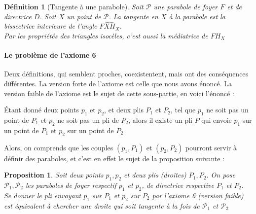 \documentclass[a4paper,12pt,french]{report}
\newtheorem{proposition}{Proposition}[section]
\newtheorem{definition}{Définition}[section]
\begin{document}
			\begin{definition}[Tangente à une parabole]
				Soit $\mathcal{P}$ une parabole de foyer $F$ et de directrice $D$. Soit $X$ un point de $\mathcal{P}$. La tangente en $X$ à la parabole est la bissectrice interieure de l'angle $\widehat{FXH_{X}}$.\\
				Par les propriétés des triangles isocèles, c'est aussi la médiatrice de $FH_{X}$
			\end{definition}
			
			\paragraph{Le problème de l'axiome 6}
			Deux définitions, qui semblent proches, coexistentent, mais ont des conséquences différentes. La version forte de l'axiome est celle que nous avons énoncé. La version faible de l'axiome est le sujet de cette sous-partie, en voici l'énoncé :
			
			\begin{axiome}
			Étant donné deux points $p_{1}$ et $p_{2}$, et deux plis $P_{1}$ et $P_{2}$, tel que $p_{1}$ ne soit pas un point de $P_{1}$ et $p_{2}$ ne soit pas un pli de $P_{2}$, alors il existe un pli $P$ qui envoie $p_{1}$ sur un point de $P_{1}$ et $p_{2}$ sur un point de $P_{2}$
			\end{axiome}
			
			Alors, on comprends que les couples $(p_{1},P_{1})$ et $(p_{2},P_{2})$ pourront servir à définir des paraboles, et c'est en effet le sujet de la proposition suivante : 
			
			\begin{proposition}
				Soit deux points $p_{1},p_{2}$ et deux plis (droites) $P_{1},P_{2}$. On pose $\mathcal{P}_{1},\mathcal{P}_{2}$ les paraboles de foyer respectif $p_{1}$ et $p_{2}$, de directrice respective $P_{1}$ et $P_{2}$. Se donner le pli envoyant $p_{1}$ sur $P_{1}$ et $p_{2}$ sur $P_{2}$ par l'axiome 6 (version faible) est équivalent à chercher une droite qui soit tangente à la fois de $\mathcal{P}_{1}$ et $\mathcal{P}_{2}$
			\end{proposition}
			
\end{document}
